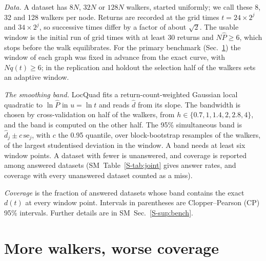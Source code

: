 \documentclass[aps,pre,twocolumn,superscriptaddress,nofootinbib,10pt]{revtex4-2}
\newcommand{\SM}{SM}
\newcommand{\nm}[1]{\textsf{#1}}
\newcommand{\LQ}{\nm{LocQuad}}
\begin{document}
\emph{Data.} A dataset has $8N$, $32N$ or $128N$ walkers, started uniformly; we call these 8, 32 and 128 walkers per node. Returns are recorded at the grid times $t=24\times2^j$ and $34\times2^j$, so successive times differ by a factor of about $\sqrt2$. The usable window is the initial run of grid times with at least 30 returns and $N\hat P\ge6$, which stops before the walk equilibrates. For the primary benchmark (Sec.~\ref{sec:budget}) the window of each graph was fixed in advance from the exact curve, with $Nq(t)\ge6$; in the replication and holdout the selection half of the walkers sets an adaptive window.

\emph{The smoothing band.} \LQ{} fits a return-count-weighted Gaussian local quadratic to $\ln\hat P$ in $u=\ln t$ and reads $\hat d$ from its slope. The bandwidth is chosen by cross-validation on half of the walkers, from $h\in\{0.7,1,1.4,2,2.8,4\}$, and the band is computed on the other half. The 95\% simultaneous band is $\hat d_j\pm c\,\mathrm{se}_j$, with $c$ the 0.95 quantile, over block-bootstrap resamples of the walkers, of the largest studentised deviation in the window. A band needs at least six window points. A dataset with fewer is unanswered, and coverage is reported among answered datasets (\SM\ Table~\ref{S-tab:joint} gives answer rates, and coverage with every unanswered dataset counted as a miss).

\emph{Coverage} is the fraction of answered datasets whose band contains the exact $d(t)$ at every window point. Intervals in parentheses are Clopper--Pearson (CP) 95\% intervals. Further details are in \SM\ Sec.~\ref{S-sup:bench}.

\section{More walkers, worse coverage}\label{sec:budget}
\end{document}
